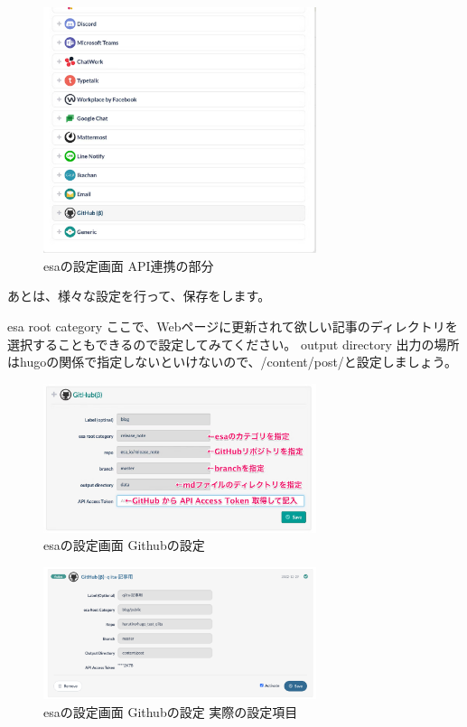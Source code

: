   \begin{figure}[H]
    \centering
    \includegraphics[width=8cm]{./image/02-chap7/esa-setting-list.png}
    \caption{esaの設定画面 API連携の部分 }
    \label{chap7-esa-setting-list-image}
  \end{figure}

  あとは、様々な設定を行って、保存をします。

  esa root category
  ここで、Webページに更新されて欲しい記事のディレクトリを選択することもできるので設定してみてください。
  output directory
  出力の場所はhugoの関係で指定しないといけないので、/content/post/と設定しましょう。

  \begin{figure}[H]
    \centering
    \includegraphics[width=8cm]{./image/02-chap7/github-setting.png}
    \caption{esaの設定画面 Githubの設定 }
    \label{chap7-github-setting-image}
  \end{figure}

  \begin{figure}[H]
    \centering
    \includegraphics[width=8cm]{./image/02-chap7/github-setting-writed.png}
    \caption{esaの設定画面 Githubの設定 実際の設定項目 }
    \label{chap7-github-setting-writed-image}
  \end{figure}

